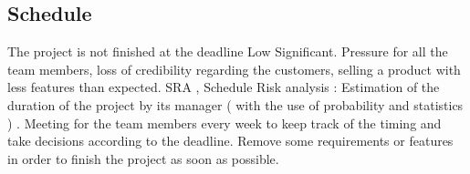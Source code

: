 

\subsection{Schedule}
{The project is not finished at the deadline}
{Low}
{Significant. Pressure for all the team members, loss of credibility regarding the customers, selling a product with less features than expected.}
{ SRA , Schedule Risk analysis : Estimation of the duration of the project by its manager ( with the use of probability and statistics ) . Meeting for the team members every week to keep track of the timing and take decisions according to the deadline. }
{ Remove some requirements or features in order to finish the project as soon as possible. }